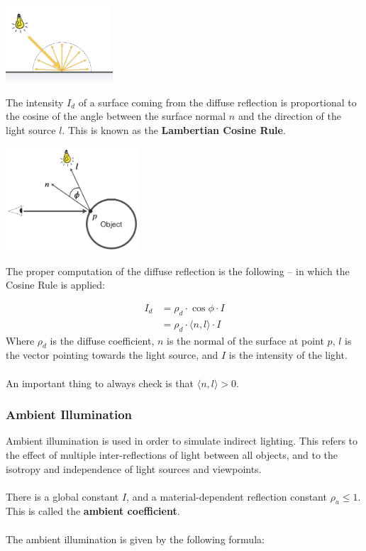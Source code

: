 \documentclass{article}
\begin{document}
\begin{center}
	\includegraphics[width=4cm]{lambertian_surf.png}
\end{center}
The intensity $I_d$ of a surface coming from the diffuse reflection is proportional to the cosine of the angle between the surface normal $n$ and the direction of the light source $l$. This is known as the \textbf{Lambertian Cosine Rule}.

\begin{center}
	\includegraphics[width=5cm]{cos_rule.png}
\end{center}
The proper computation of the diffuse reflection is the following -- in which the Cosine Rule is applied:

\begin{align*}
	I_d &= \rho_d \cdot \cos\phi \cdot I \\
	&= \rho_d \cdot \langle n, l \rangle \cdot I
\end{align*}
Where $\rho_d$ is the diffuse coefficient, $n$ is the normal of the surface at point $p$, $l$ is the vector pointing towards the light source, and $I$ is the intensity of the light. \\ \\
An important thing to always check is that $\langle n, l \rangle > 0$.

\subsubsection{Ambient Illumination}
Ambient illumination is used in order to simulate indirect lighting. This refers to the effect of multiple inter-reflections of light between all objects, and to the isotropy and independence of light sources and viewpoints. \\ \\
There is a global constant $I$, and a material-dependent reflection constant $\rho_a \leq 1$. This is called the \textbf{ambient coefficient}. \\ \\
The ambient illumination is given by the following formula:
\end{document}
